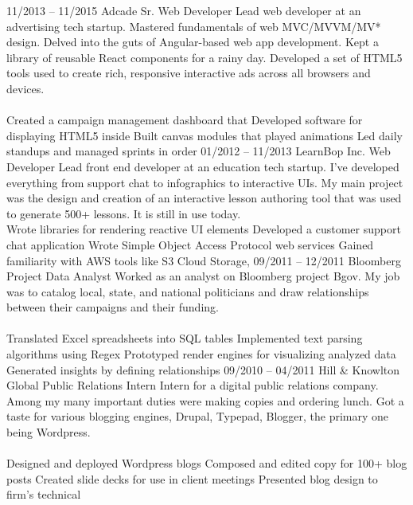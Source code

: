 \documentclass[]{friggeri-cv}
\begin{document}
\tabentry
  {11/2013 – 11/2015}
  {Adcade}
  {Sr. Web Developer}
  {Lead web developer at an advertising tech startup. Mastered fundamentals of web MVC/MVVM/MV* design. Delved into the guts of Angular-based web app development. Kept a library of reusable React components for a rainy day. Developed a set of HTML5 tools used to create rich, responsive interactive ads across all browsers and devices.\\%
  \\%
    \bulletlist
    {Created a campaign management dashboard that }
    {Developed software for displaying HTML5 inside }
    {Built canvas modules that played animations }
    {Led daily standups and managed sprints in order }
  }
\tabentry
  {01/2012 – 11/2013}
  {LearnBop Inc.}
  {Web Developer}
  {Lead front end developer at an education tech startup. I've developed everything from support chat to infographics to interactive UIs. My main project was the design and creation of an interactive lesson authoring tool that was used to generate 500+ lessons. It is still in use today.
  \\%
    \bulletlist
    {Wrote libraries for rendering reactive UI elements }
    {Developed a customer support chat application }
    {Wrote Simple Object Access Protocol web services }
    {Gained familiarity with AWS tools like S3 Cloud Storage, }
  }
\pagebreak
\tabentry
  {09/2011 – 12/2011}
  {Bloomberg}
  {Project Data Analyst}
  {Worked as an analyst on Bloomberg project Bgov. My job was to catalog local, state, and national politicians and draw relationships between their campaigns and their funding.\\%
  \\%
    \bulletlist
    {Translated Excel spreadsheets into SQL tables}
    {Implemented text parsing algorithms using Regex}
    {Prototyped render engines for visualizing analyzed data}
    {Generated insights by defining relationships }
  }
\tabentry
  {09/2010 – 04/2011}
  {Hill \& Knowlton Global Public Relations}
  {Intern}
  {Intern for a digital public relations company. Among my many important duties were making copies and ordering lunch. Got a taste for various blogging engines, Drupal, Typepad, Blogger, the primary one being Wordpress.\\%
  \\%
    \bulletlist
    {Designed and deployed Wordpress blogs}
    {Composed and edited copy for 100+ blog posts}
    {Created slide decks for use in client meetings}
    {Presented blog design to firm's technical }
  }
\end{document}
